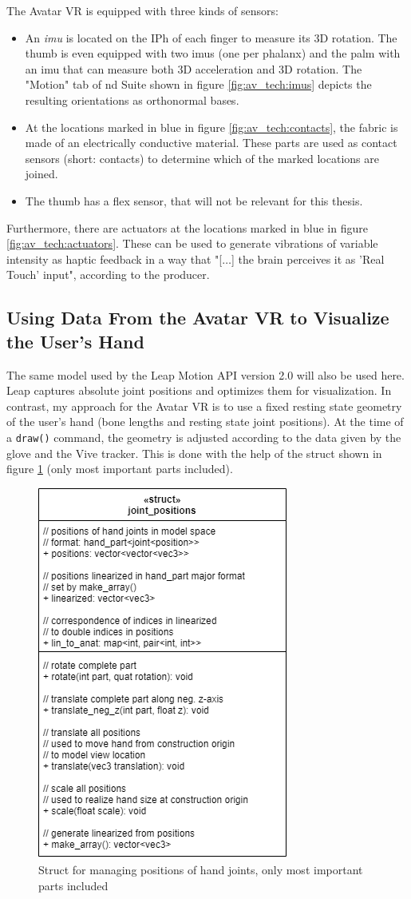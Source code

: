 \documentclass[hyperref, bachelorofscience]{cgvpub}
\begin{document}
The Avatar VR is equipped with three kinds of sensors: 
\vspace{.3cm}
\begin{itemize}
	\item An \emph{\acrfull{imu}} is located on the \gls{IPh} of each finger to measure its 3D rotation. The thumb is even equipped with two \acrshort{imu}s (one per phalanx) and the palm with an \acrshort{imu} that can measure both 3D acceleration and 3D rotation. The "Motion" tab of \acrshort{nd} Suite shown in figure \ref{fig:av_tech:imus} depicts the resulting orientations as orthonormal bases. 
	\item At the locations marked in blue in figure \ref{fig:av_tech:contacts}, the fabric is made of an electrically conductive material. These parts are used as contact sensors (short: contacts) to determine which of the marked locations are joined.
	\item The thumb has a flex sensor, that will not be relevant for this thesis.
\end{itemize}

Furthermore, there are actuators at the locations marked in blue in figure \ref{fig:av_tech:actuators}. These can be used to generate vibrations of variable intensity as haptic feedback in a way that "[$\dots$] the brain perceives it as 'Real Touch' input", according to the producer.

\subsection{Using Data From the Avatar VR to Visualize the User's Hand}
The same model used by the Leap Motion API version 2.0 will also be used here. Leap captures absolute joint positions and optimizes them for visualization. In contrast, my approach for the Avatar VR is to use a fixed resting state geometry of the user's hand (bone lengths and resting state joint positions). At the time of a \lstinline|draw()| command, the geometry is adjusted according to the data given by the glove and the Vive tracker. This is done with the help of the struct shown in figure \ref{fig:joint_positions} (only most important parts included).

\begin{figure}
	\includegraphics[width=.4\linewidth]{../pics/joint_positions}
	\caption{Struct for managing positions of hand joints, only most important parts included}
	\label{fig:joint_positions}
\end{figure}
\end{document}
